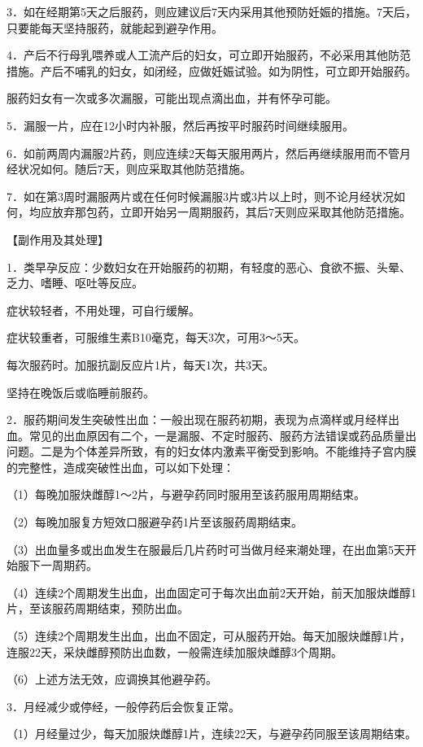 \documentclass[12pt,UTF8,openany]{ctexbook}
\begin{document}
3．如在经期第5天之后服药，则应建议后7天内采用其他预防妊娠的措施。7天后，只要能每天坚持服药，就能起到避孕作用。

4．产后不行母乳喂养或人工流产后的妇女，可立即开始服药，不必采用其他防范措施。产后不哺乳的妇女，如闭经，应做妊娠试验。如为阴性，可立即开始服药。

服药妇女有一次或多次漏服，可能出现点滴出血，并有怀孕可能。

5．漏服一片，应在12小时内补服，然后再按平时服药时间继续服用。

6．如前两周内漏服2片药，则应连续2天每天服用两片，然后再继续服用而不管月经状况如何。随后7天，则应采取其他防范措施。

7．如在第3周时漏服两片或在任何时候漏服3片或3片以上时，则不论月经状况如何，均应放弃那包药，立即开始另一周期服药，其后7天则应采取其他防范措施。

【副作用及其处理】

1．类早孕反应：少数妇女在开始服药的初期，有轻度的恶心、食欲不振、头晕、乏力、嗜睡、呕吐等反应。

症状较轻者，不用处理，可自行缓解。

症状较重者，可服维生素B10毫克，每天3次，可用3～5天。

每次服药时。加服抗副反应片1片，每天1次，共3天。

坚持在晚饭后或临睡前服药。

2．服药期间发生突破性出血：一般出现在服药初期，表现为点滴样或月经样出血。常见的出血原因有二个，一是漏服、不定时服药、服药方法错误或药品质量出问题。二是为个体差异所致，有的妇女体内激素平衡受到影响。不能维持子宫内膜的完整性，造成突破性出血，可以如下处理：

（1）每晚加服炔雌醇1～2片，与避孕药同时服用至该药服用周期结束。

（2）每晚加服复方短效口服避孕药1片至该服药周期结束。

（3）出血量多或出血发生在服最后几片药时可当做月经来潮处理，在出血第5天开始服下一周期药。

（4）连续2个周期发生出血，出血固定可于每次出血前2天开始，前天加服炔雌醇1片，至该服药周期结束，预防出血。

（5）连续2个周期发生出血，出血不固定，可从服药开始。每天加服炔雌醇1片，连服22天，采炔雌醇预防出血数，一般需连续加服炔雌醇3个周期。

（6）上述方法无效，应调换其他避孕药。

3．月经减少或停经，一般停药后会恢复正常。

（1）月经量过少，每天加服炔雌醇1片，连续22天，与避孕药同服至该周期结束。
\end{document}
